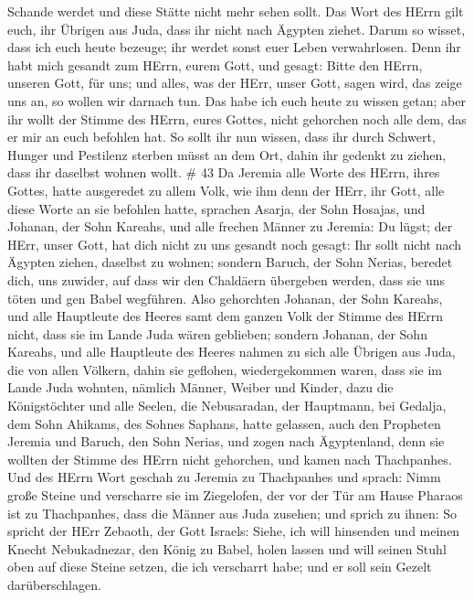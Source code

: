 Schande werdet und diese Stätte nicht mehr sehen sollt. 
Das Wort des HErrn gilt euch, ihr Übrigen aus Juda, dass ihr nicht nach
Ägypten ziehet. Darum so wisset, dass ich euch heute bezeuge;
 ihr werdet sonst euer Leben verwahrlosen. Denn ihr habt
mich gesandt zum HErrn, eurem Gott, und gesagt: Bitte den HErrn, unseren
Gott, für uns; und alles, was der HErr, unser Gott, sagen wird, das
zeige uns an, so wollen wir darnach tun.  Das habe ich euch
heute zu wissen getan; aber ihr wollt der Stimme des HErrn, eures
Gottes, nicht gehorchen noch alle dem, das er mir an euch befohlen hat.
 So sollt ihr nun wissen, dass ihr durch Schwert, Hunger
und Pestilenz sterben müsst an dem Ort, dahin ihr gedenkt zu ziehen,
dass ihr daselbst wohnen wollt. \# 43  Da Jeremia alle Worte
des HErrn, ihres Gottes, hatte ausgeredet zu allem Volk, wie ihm denn
der HErr, ihr Gott, alle diese Worte an sie befohlen hatte, 
sprachen Asarja, der Sohn Hosajas, und Johanan, der Sohn Kareahs, und
alle frechen Männer zu Jeremia: Du lügst; der HErr, unser Gott, hat dich
nicht zu uns gesandt noch gesagt: Ihr sollt nicht nach Ägypten ziehen,
daselbst zu wohnen;  sondern Baruch, der Sohn Nerias,
beredet dich, uns zuwider, auf dass wir den Chaldäern übergeben werden,
dass sie uns töten und gen Babel wegführen.  Also gehorchten
Johanan, der Sohn Kareahs, und alle Hauptleute des Heeres samt dem
ganzen Volk der Stimme des HErrn nicht, dass sie im Lande Juda wären
geblieben;  sondern Johanan, der Sohn Kareahs, und alle
Hauptleute des Heeres nahmen zu sich alle Übrigen aus Juda, die von
allen Völkern, dahin sie geflohen, wiedergekommen waren, dass sie im
Lande Juda wohnten,  nämlich Männer, Weiber und Kinder, dazu
die Königstöchter und alle Seelen, die Nebusaradan, der Hauptmann, bei
Gedalja, dem Sohn Ahikams, des Sohnes Saphans, hatte gelassen, auch den
Propheten Jeremia und Baruch, den Sohn Nerias,  und zogen
nach Ägyptenland, denn sie wollten der Stimme des HErrn nicht gehorchen,
und kamen nach Thachpanhes.  Und des HErrn Wort geschah zu
Jeremia zu Thachpanhes und sprach:  Nimm große Steine und
verscharre sie im Ziegelofen, der vor der Tür am Hause Pharaos ist zu
Thachpanhes, dass die Männer aus Juda zusehen;  und sprich
zu ihnen: So spricht der HErr Zebaoth, der Gott Israels: Siehe, ich will
hinsenden und meinen Knecht Nebukadnezar, den König zu Babel, holen
lassen und will seinen Stuhl oben auf diese Steine setzen, die ich
verscharrt habe; und er soll sein Gezelt darüberschlagen. 
